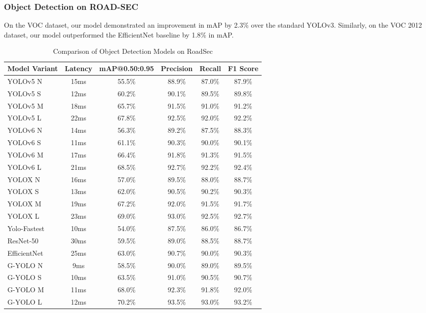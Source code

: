 \subsubsection{Object Detection on ROAD-SEC}

On the VOC dataset, our model demonstrated an improvement in mAP by 2.3\% over the standard YOLOv3. Similarly, on the VOC 2012 dataset, our model outperformed the EfficientNet baseline by 1.8\% in mAP.

\begin{table}[htbp]
    \centering
    \caption{Comparison of Object Detection Models on RoadSec}
    \label{tab:roadsec_model_comparison}
    \begin{tabularx}{\textwidth}{@{}Xccccc@{}}
    \toprule
    Model Variant & Latency & mAP@0.50:0.95 & Precision & Recall & F1 Score \\ 
    \midrule
    \cite{ultralytics2021yolov5}YOLOv5 N & 15ms & 55.5\% & 88.9\% & 87.0\% & 87.9\% \\
    \cite{ultralytics2021yolov5}YOLOv5 S & 12ms & 60.2\% & 90.1\% & 89.5\% & 89.8\% \\
    \cite{ultralytics2021yolov5}YOLOv5 M & 18ms & 65.7\% & 91.5\% & 91.0\% & 91.2\% \\
    \cite{ultralytics2021yolov5}YOLOv5 L & 22ms & 67.8\% & 92.5\% & 92.0\% & 92.2\% \\
    \addlinespace
    \cite{li2023yolov6}YOLOv6 N & 14ms & 56.3\% & 89.2\% & 87.5\% & 88.3\% \\
    \cite{li2023yolov6}YOLOv6 S & 11ms & 61.1\% & 90.3\% & 90.0\% & 90.1\% \\
    \cite{li2023yolov6}YOLOv6 M & 17ms & 66.4\% & 91.8\% & 91.3\% & 91.5\% \\
    \cite{li2023yolov6}YOLOv6 L & 21ms & 68.5\% & 92.7\% & 92.2\% & 92.4\% \\
    \addlinespace
    \cite{ge2021yolox}YOLOX N & 16ms & 57.0\% & 89.5\% & 88.0\% & 88.7\% \\
    \cite{ge2021yolox}YOLOX S & 13ms & 62.0\% & 90.5\% & 90.2\% & 90.3\% \\
    \cite{ge2021yolox}YOLOX M & 19ms & 67.2\% & 92.0\% & 91.5\% & 91.7\% \\
    \cite{ge2021yolox}YOLOX L & 23ms & 69.0\% & 93.0\% & 92.5\% & 92.7\% \\
    \addlinespace
    \cite{dog2021dog}Yolo-Fastest & 10ms & 54.0\% & 87.5\% & 86.0\% & 86.7\% \\
    \cite{he2016deep}ResNet-50 & 30ms & 59.5\% & 89.0\% & 88.5\% & 88.7\% \\
    \cite{tan2019efficientnet}EfficientNet & 25ms & 63.0\% & 90.7\% & 90.0\% & 90.3\% \\
    \addlinespace
    G-YOLO N & 9ms & 58.5\% & 90.0\% & 89.0\% & 89.5\% \\
    G-YOLO S & 10ms & 63.5\% & 91.0\% & 90.5\% & 90.7\% \\
    G-YOLO M & 11ms & 68.0\% & 92.3\% & 91.8\% & 92.0\% \\
    G-YOLO L & 12ms & 70.2\% & 93.5\% & 93.0\% & 93.2\% \\
    \bottomrule
    \end{tabularx}
\end{table}

